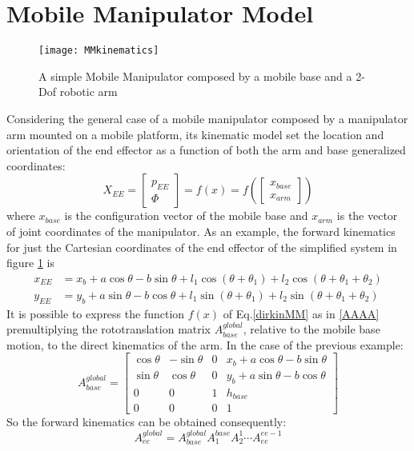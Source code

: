 \section{Mobile Manipulator Model}
\begin{figure}
\centering
\texttt{[image: MMkinematics]}
\caption{A simple Mobile Manipulator composed by a mobile base and a 2-Dof robotic arm}
\label{fig:MMkinematics}
\end{figure}
Considering the general case of a mobile manipulator composed by a manipulator arm mounted on a mobile platform, its kinematic model set the location and orientation of the end effector as a function of both the arm and base generalized coordinates:
\begin{equation}\label{dirkinMM}
	X_{EE}=\left[\begin{matrix}p_{EE}\\\Phi\end{matrix}\right]=f(x)=f\left(\left[\begin{matrix}x_{base}\\x_{arm} \end{matrix}\right]\right)
\end{equation}
where $x_{base}$ is the configuration vector of the mobile base and $x_{arm}$ is the vector of joint coordinates of the manipulator.
As an example, the forward kinematics for just the Cartesian coordinates of the end effector of the simplified system in figure \ref{fig:MMkinematics} is
\begin{equation*}
\begin{split}
	x_{EE}&=x_b+a\cos\theta-b\sin\theta+l_1\cos\left(\theta+\theta_1\right)+l_2\cos\left(\theta+\theta_1+\theta_2\right)\\
	y_{EE}&=y_b+a\sin\theta-b\cos\theta+l_1\sin\left(\theta+\theta_1\right)+l_2\sin\left(\theta+\theta_1+\theta_2\right)
\end{split}
\end{equation*}
It is possible to express the function $f(x)$ of Eq.\ref{dirkinMM} as in \ref{AAAA} premultiplying the rototranslation matrix $A_{base}^{global}$, relative to the mobile base motion, to the direct kinematics of the arm. In the case of the previous example:
\begin{equation}
	A_{base}^{global}=\left[\begin{matrix}
		\cos\theta&-\sin\theta&0&x_b+a\cos\theta-b\sin\theta\\
		\sin\theta&\cos\theta&0&y_b+a\sin\theta-b\cos\theta\\
		0&0&1&h_{base}\\
		0&0&0&1
	\end{matrix}\right]
\end{equation}
So the forward kinematics can be obtained consequently:
\begin{equation}
A_{ee}^{global}=A_{base}^{global}A_1^{base}A_2^1\cdots A_{ee}^{ee-1}
\end{equation}
